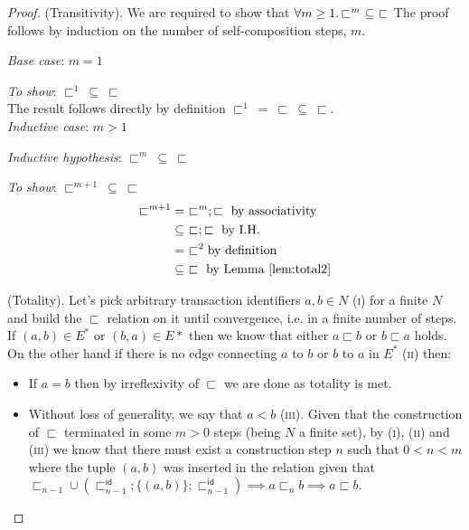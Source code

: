\begin{proof}
(Transitivity). We are required to show that $\forall m \geq 1 \ldotp \sqsubset^m\ \subseteq\ \sqsubset$ The proof follows by induction on the number of self-composition steps, $m$.

{\parindent0pt
\textit{Base case}: $m = 1$

\textit{To show}: $\sqsubset^1\ \subseteq\ \sqsubset$ \\

The result follows directly by definition $\sqsubset^1\ =\ \sqsubset\ \subseteq\ \sqsubset$. \\

\textit{Inductive case}: $m > 1$

\textit{Inductive hypothesis}: $\sqsubset^m\ \subseteq\ \sqsubset$

\textit{To show}: $\sqsubset^{m + 1}\ \subseteq\ \sqsubset$
\begin{align*}
	\sqsubset^{m + 1}
	&=\ \sqsubset^m ; \sqsubset \text{ by associativity} \\
	&\subseteq\ \sqsubset ; \sqsubset \text{ by I.H.} \\
	&=\ \sqsubset^2 \text{by definition} \\
	&\subseteq\ \sqsubset \text{ by Lemma \ref{lem:total2}}
\end{align*}
}

(Totality). Let's pick arbitrary transaction identifiers $a, b \in N$ (\textsc{i}) for a finite $N$ and build the $\sqsubset$ relation on it until convergence, i.e. in a finite number of steps. If $(a, b) \in E^*$ or $(b, a) \in E*$ then we know that either $a \sqsubset b$ or $b \sqsubset a$ holds. On the other hand if there is no edge connecting $a$ to $b$ or $b$ to $a$ in $E^*$ (\textsc{ii}) then:
\begin{itemize}
	\item If $a = b$ then by irreflexivity of $\sqsubset$ we are done as totality is met.
	\item Without loss of generality, we say that $a < b$ (\textsc{iii}). Given that the construction of $\sqsubset$ terminated in some $m > 0$ steps (being $N$ a finite set), by (\textsc{i}), (\textsc{ii}) and (\textsc{iii}) we know that there must exist a construction step $n$ such that $0 < n < m$ where the tuple $(a, b)$ was inserted in the relation given that $\sqsubset_{n-1} \cup \left( \sqsubset_{n-1}^\mathsf{id} ; \{(a,b)\} ; \sqsubset_{n-1}^\mathsf{id} \right) \implies a \sqsubset_n b \implies a \sqsubset b$. 
\end{itemize}
\end{proof}

